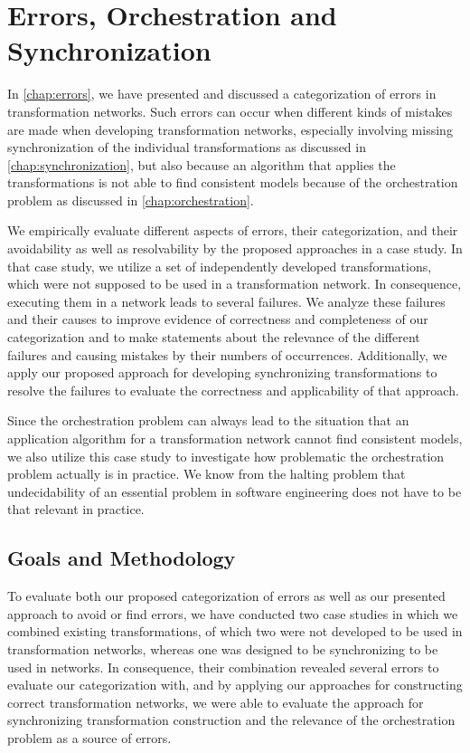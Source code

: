 \section{Errors, Orchestration and Synchronization}
\label{chap:correctness_evaluation:categorization}

In \autoref{chap:errors}, we have presented and discussed a categorization of errors in transformation networks.
Such errors can occur when different kinds of mistakes are made when developing transformation networks, especially involving missing synchronization of the individual transformations as discussed in \autoref{chap:synchronization}, but also because an algorithm that applies the transformations is not able to find consistent models because of the orchestration problem as discussed in \autoref{chap:orchestration}.

We empirically evaluate different aspects of errors, their categorization, and their avoidability as well as resolvability by the proposed approaches in a case study.
In that case study, we utilize a set of independently developed transformations, which were not supposed to be used in a transformation network.
In consequence, executing them in a network leads to several failures.
We analyze these failures and their causes to improve evidence of correctness and completeness of our categorization and to make statements about the relevance of the different failures and causing mistakes by their numbers of occurrences.
Additionally, we apply our proposed approach for developing synchronizing transformations to resolve the failures to evaluate the correctness and applicability of that approach.

Since the orchestration problem can always lead to the situation that an application algorithm for a transformation network cannot find consistent models, we also utilize this case study to investigate how problematic the orchestration problem actually is in practice.
We know from the halting problem that undecidability of an essential problem in software engineering does not have to be that relevant in practice.


\subsection{Goals and Methodology}

To evaluate both our proposed categorization of errors as well as our presented approach to avoid or find errors, we have conducted two case studies in which we combined existing transformations, of which two were not developed to be used in transformation networks, whereas one was designed to be synchronizing to be used in networks.
In consequence, their combination revealed several errors to evaluate our categorization with, and by applying our approaches for constructing correct transformation networks, we were able to evaluate the approach for synchronizing transformation construction and the relevance of the orchestration problem as a source of errors.


